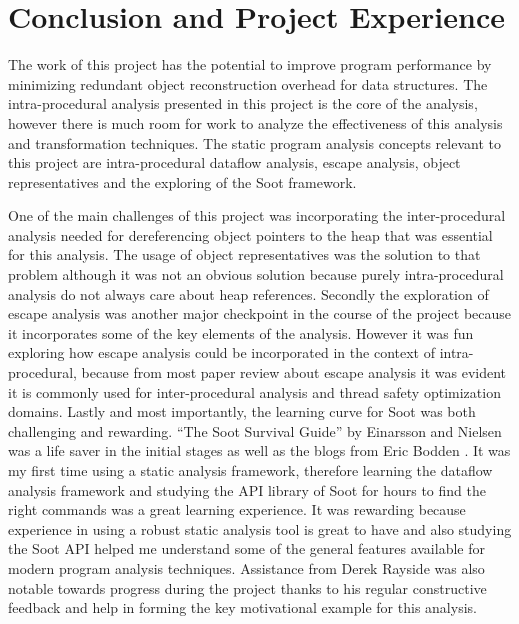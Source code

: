 \newpage
\section{Conclusion and Project Experience}
The work of this project has the potential to improve program performance by minimizing redundant object reconstruction overhead for data structures. The intra-procedural analysis presented in this project is the core of the analysis, however there is much room for work to analyze the effectiveness of this analysis and transformation techniques. The static program analysis concepts relevant  to this project are intra-procedural dataflow analysis, escape analysis, object representatives and the exploring of the Soot framework.

One of the main challenges of this project was incorporating the inter-procedural analysis needed for dereferencing object pointers to the heap that was essential for this analysis. The usage of object representatives was the solution to that problem although it was not an obvious solution because purely intra-procedural analysis do not always care about heap references. Secondly the exploration of escape analysis was another major checkpoint in the course of the project because it incorporates some of the key elements of the analysis. However it was fun exploring how escape analysis could be incorporated in the context of intra-procedural, because from most paper review about escape analysis it was evident it is commonly used for inter-procedural analysis and thread safety optimization domains. Lastly and most importantly, the learning curve for Soot was both challenging and rewarding. ``The Soot Survival Guide'' \cite{ref:sootsurvival} by Einarsson and Nielsen was a life saver in the initial stages as well as the blogs from Eric Bodden \cite{ref:tutorial}. It was my first time using a static analysis framework, therefore learning the dataflow analysis framework and studying the API library of Soot for hours to find the right commands was a great learning experience. It was rewarding because experience in using a robust static analysis tool is great to have and also studying the Soot API helped me understand some of the general features available for modern program analysis techniques. Assistance from Derek Rayside was also notable towards progress during the project thanks to his regular constructive feedback and help in forming the key motivational example for this analysis.